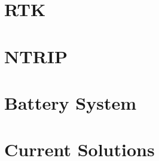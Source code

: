 \section{RTK}\label{II_rtk}

\section{NTRIP}\label{sec:II_ntrip}

\section{Battery System}\label{sec:II_battery}

\section{Current Solutions}\label{sec:II_curr_solutions}




